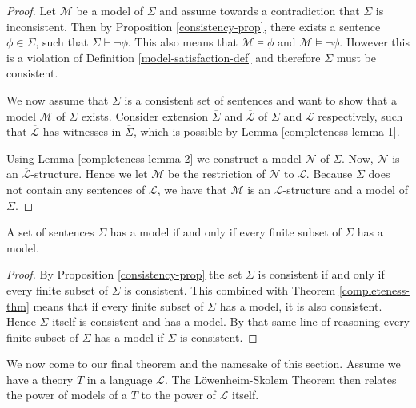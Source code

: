 \documentclass[../../main.tex]{subfiles}
\begin{document}
\begin{proof}
    Let $\mathcal{M}$ be a model of $\Sigma$ and assume towards a contradiction that $\Sigma$ is inconsistent.
    Then by Proposition \ref{consistency-prop}, there exists a sentence $\phi \in \Sigma$, such that $\Sigma \vdash \lnot\phi$.
    This also means that $\mathcal{M} \models \phi$ and $\mathcal{M} \models \lnot \phi$.
    However this is a violation of Definition \ref{model-satisfaction-def} and therefore $\Sigma$ must be consistent.

    We now assume that $\Sigma$ is a consistent set of sentences and want to show that a model $\mathcal{M}$ of $\Sigma$ exists.
    Consider extension $\overline{\Sigma}$ and $\overline{\mathcal{L}}$ of $\Sigma$ and $\mathcal{L}$ respectively,
    such that $\overline{\mathcal{L}}$ has witnesses in $\overline{\Sigma}$, which is possible by Lemma \ref{completeness-lemma-1}.

    Using Lemma \ref{completeness-lemma-2} we construct a model $\mathcal{N}$ of $\overline{\Sigma}$.
    Now, $\mathcal{N}$ is an $\overline{\mathcal{L}}$-structure.
    Hence we let $\mathcal{M}$ be the restriction of $\mathcal{N}$ to $\mathcal{L}$.
    Because $\Sigma$ does not contain any sentences of $\overline{\mathcal{L}}$,
    we have that $\mathcal{M}$ is an $\mathcal{L}$-structure and a model of $\Sigma$.
\end{proof}

\begin{theorem}\label{compactness-thm}\cite[Theorem 1.3.22]{Cha90}
    A set of sentences $\Sigma$ has a model if and only if every finite subset of $\Sigma$ has a model.
\end{theorem}

\begin{proof}
    By Proposition \ref{consistency-prop} the set $\Sigma$ is consistent if and only if every finite subset of $\Sigma$ is consistent.
    This combined with Theorem \ref{completeness-thm} means that if every finite subset of $\Sigma$ has a model, it is also consistent.
    Hence $\Sigma$ itself is consistent and has a model.
    By that same line of reasoning every finite subset of $\Sigma$ has a model if $\Sigma$ is consistent.
\end{proof}

We now come to our final theorem and the namesake of this section.
Assume we have a theory $T$ in a language $\mathcal{L}$.
The Löwenheim-Skolem Theorem then relates the power of models of a $T$ to the power of $\mathcal{L}$ itself.
\end{document}
